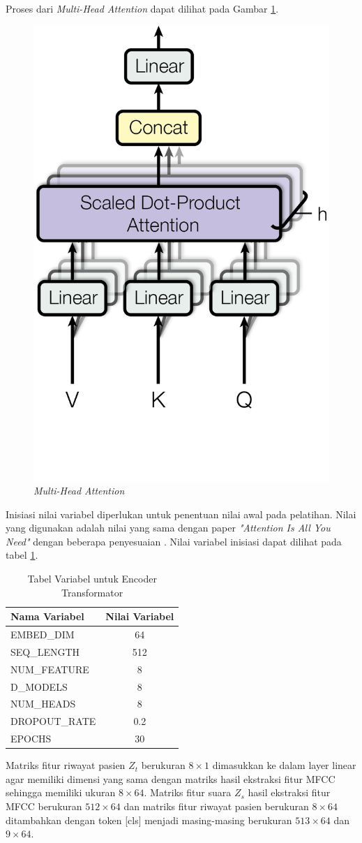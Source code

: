 Proses dari \textit{Multi-Head Attention} dapat dilihat pada Gambar \ref{fig:multi_head_attention}.
\begin{figure}[H]
    \centering
    \includegraphics[width=0.38\linewidth]{gambar/ModalNet-20.png}
    \caption{\textit{Multi-Head Attention}}
    \label{fig:multi_head_attention}
\end{figure}

Inisiasi nilai variabel diperlukan untuk penentuan nilai awal pada pelatihan. Nilai yang digunakan adalah nilai yang sama dengan paper \textit{"Attention Is All You Need"} dengan beberapa penyesuaian \cite{vaswani2023attentionneed}. Nilai variabel inisiasi dapat dilihat pada tabel \ref{tab:transformer_encoder_vars}.
\begin{table}[H]
    \centering
    \caption{Tabel Variabel untuk Encoder Transformator}
    \begin{tabular}{l c}
        \hline
        \textbf{Nama Variabel} & \textbf{Nilai Variabel} \\ \hline
        EMBED\_DIM & 64 \\ \hline
        SEQ\_LENGTH & 512 \\ \hline
        NUM\_FEATURE & 8 \\ \hline
        D\_MODELS & 8 \\ \hline
        NUM\_HEADS & 8 \\ \hline
        DROPOUT\_RATE & 0.2 \\ \hline
        EPOCHS & 30 \\ \hline
    \end{tabular}
    \label{tab:transformer_encoder_vars}
\end{table}

Matriks fitur riwayat pasien $Z_t$ berukuran $8\times1$ dimasukkan ke dalam layer linear agar memiliki dimensi yang sama dengan matriks hasil ekstraksi fitur MFCC sehingga memiliki ukuran $8\times64$. Matriks fitur suara $Z_s$ hasil ekstraksi fitur MFCC berukuran $512\times64$ dan matriks fitur riwayat pasien berukuran $8\times64$ ditambahkan dengan token [cls] menjadi masing-masing berukuran $513\times64$ dan $9\times64$.

